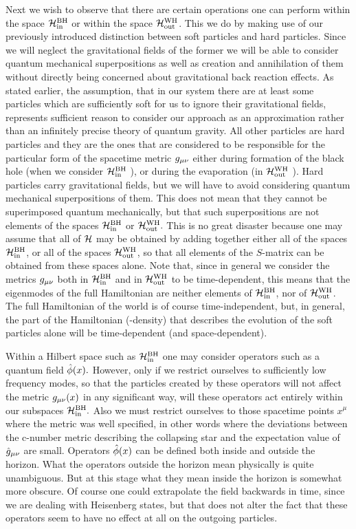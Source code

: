 Next we wish to observe that there are certain operations one can
perform within the space ${\rm {\cal H}_{in}^{BH}}$ or within the space ${\rm {\cal H}_{out}^{WH}}$. This
we do by making use of our previously introduced distinction between
soft particles and hard particles. Since we will neglect the
gravitational fields of the former we will be able to consider
quantum mechanical superpositions as well as creation and annihilation
of them without directly being concerned about gravitational back
reaction effects. As stated earlier, the assumption, that in our system
there are at least some particles which are sufficiently soft for us to
ignore their gravitational fields, represents sufficient reason to
consider our approach as an approximation rather than an infinitely
precise theory of quantum gravity.  All other particles are hard
particles and they are the ones that are considered to be responsible
for the particular form of the spacetime metric $g_{\mu\nu}$ either
during formation of the black hole (when we consider  ${\rm {\cal H}_{in}^{BH}}$ ), or
during the evaporation (in  ${\rm {\cal H}_{out}^{WH}}$ ). Hard particles carry
gravitational fields, but we will have to avoid considering quantum
mechanical superpositions of them. This does not mean that they cannot
be superimposed quantum mechanically, but that such superpositions are not
elements of the spaces  ${\rm {\cal H}_{in}^{BH}}$  or ${\rm {\cal H}_{out}^{WH}}.$ This is no great disaster
because one may assume that all of $\cal H$ may be obtained by adding
together either all of the spaces ${\rm {\cal H}_{in}^{BH}}$, or all of the spaces ${\rm {\cal H}_{out}^{WH}}$,
so that all elements of the $S$-matrix can be obtained from these
spaces alone.
Note that, since in general we consider the metrics $g_{\mu\nu}$ both in
${\rm {\cal H}_{in}^{BH}}$ and in ${\rm {\cal H}_{out}^{WH}}$ to be time-dependent, this means that the
eigenmodes of the full Hamiltonian are neither elements of ${\rm {\cal H}_{in}^{BH}}$, nor
of ${\rm {\cal H}_{out}^{WH}}$. The full Hamiltonian of the world is of course
time-independent, but, in general, the part of the Hamiltonian (-density)
that describes the evolution of the soft particles alone will be
time-dependent (and space-dependent).

Within a Hilbert space such as ${\rm {\cal H}_{in}^{BH}}$ one may consider operators such
as a quantum field $\hat{\phi}(x).$ However, only if we restrict
ourselves to sufficiently low frequency modes, so that the particles
created by these operators will not affect the metric $g_{\mu\nu}(x)$ in
any significant way, will these operators act entirely within our
subspaces $\rm {\cal H}_{in}^{BH}.$ Also we must restrict ourselves to
those spacetime points $x^{\mu}$ where the metric was well specified,
in other words where the deviations between the c-number metric
describing the collapsing star and the expectation value of $\hat
g_{\mu\nu}$ are small. Operators $\hat{\phi}(x)$ can be defined both
inside and outside the horizon. What the operators outside the horizon
mean physically is quite unambiguous. But at this stage what they mean
inside the horizon is somewhat more obscure. Of course one could
extrapolate the field backwards in time, since we are dealing with
Heisenberg states, but that does not alter the fact that these
operators seem to have no effect at all on the outgoing particles.

